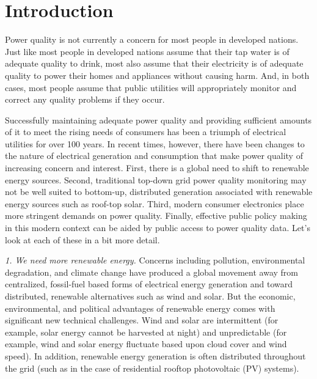 \section{Introduction}


Power quality is not currently a concern for most people in developed nations. Just like most people in developed nations assume that their tap water is of adequate quality to drink, most also assume that their electricity is of adequate quality to power their homes and appliances without causing harm. And, in both cases, most people assume that public utilities will appropriately monitor and correct any quality problems if they occur.

Successfully maintaining adequate power quality and providing sufficient amounts of it to meet the rising needs of consumers has been a triumph of electrical utilities for over 100 years. In recent times, however, there have been changes to the nature of electrical generation and consumption that make power quality of increasing concern and interest. First, there is a global need to shift to renewable energy sources. Second, traditional top-down grid power quality monitoring may not be well suited to bottom-up, distributed generation associated with renewable energy sources such as roof-top solar. Third, modern consumer electronics place more stringent demands on power quality.  Finally, effective public policy making in this modern context can be aided by public access to power quality data.  Let's look at each of these in a bit more detail.

{\em 1. We need more renewable energy.} Concerns including pollution, environmental degradation, and climate change have produced a global movement away from centralized, fossil-fuel based forms of electrical energy generation and toward distributed, renewable alternatives such as wind and solar. But the economic, environmental, and political advantages of renewable energy comes with significant new technical challenges. Wind and solar are intermittent (for example, solar energy cannot be harvested at night) and unpredictable (for example, wind and solar energy fluctuate based upon cloud cover and wind speed). In addition, renewable energy generation is often distributed throughout the grid (such as in the case of residential rooftop photovoltaic (PV) systems).

